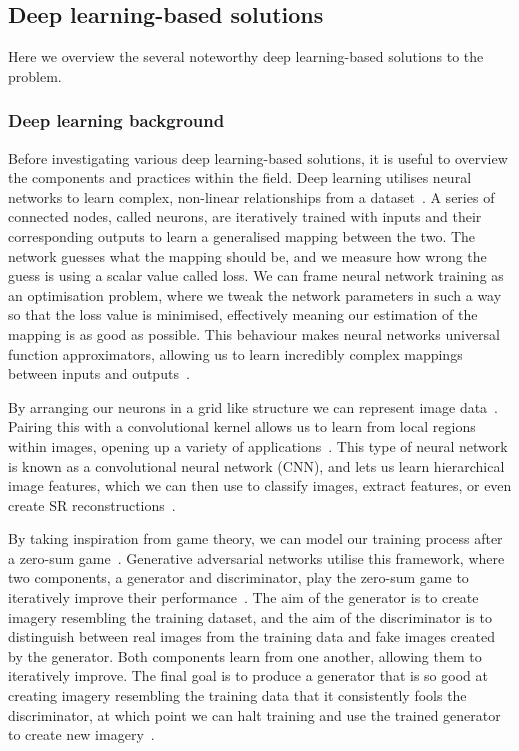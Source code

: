 \subsection{Deep learning-based solutions}
Here we overview the several noteworthy deep learning-based solutions to the problem.

\subsubsection{Deep learning background}
Before investigating various deep learning-based solutions, it is useful to overview the components and practices within the field. Deep learning utilises neural networks to learn complex, non-linear relationships from a dataset~\cite{nn}. A series of connected nodes, called neurons, are iteratively trained with inputs and their corresponding outputs to learn a generalised mapping between the two. The network guesses what the mapping should be, and we measure how wrong the guess is using a scalar value called loss. We can frame neural network training as an optimisation problem, where we tweak the network parameters in such a way so that the loss value is minimised, effectively meaning our estimation of the mapping is as good as possible. This behaviour makes neural networks universal function approximators, allowing us to learn incredibly complex mappings between inputs and outputs~\cite{nn}.

By arranging our neurons in a grid like structure we can represent image data~\cite{imageNet}. Pairing this with a convolutional kernel allows us to learn from local regions within images, opening up a variety of applications~\cite{imageNet}. This type of neural network is known as a convolutional neural network (CNN), and lets us learn hierarchical image features, which we can then use to classify images, extract features, or even create SR reconstructions~\cite{vgg19,imageNet,srcnn}.

By taking inspiration from game theory, we can model our training process after a zero-sum game~\cite{gan}. Generative adversarial networks utilise this framework, where two components, a generator and discriminator, play the zero-sum game to iteratively improve their performance~\cite{gan}. The aim of the generator is to create imagery resembling the training dataset, and the aim of the discriminator is to distinguish between real images from the training data and fake images created by the generator. Both components learn from one another, allowing them to iteratively improve. The final goal is to produce a generator that is so good at creating imagery resembling the training data that it consistently fools the discriminator, at which point we can halt training and use the trained generator to create new imagery~\cite{gan}.

